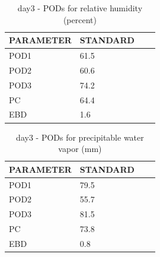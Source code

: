\begin{table}[p!]
\begin{center}
\begin{tabular}{|l|l|l|l|}
\hline
\multicolumn{1}{|c|}{\cellcolor[HTML]{C0C0C0}\textbf{PARAMETER}} & \multicolumn{1}{c|}{\cellcolor[HTML]{C0C0C0}\textbf{STANDARD}} \\
\hline
\cellcolor[HTML]{C0C0C0}POD1  & 61.5                                \\
\cellcolor[HTML]{C0C0C0}POD2  & 60.6                                \\
\cellcolor[HTML]{C0C0C0}POD3  & 74.2                                \\
\cellcolor[HTML]{C0C0C0}PC    & 64.4                                  \\
\cellcolor[HTML]{C0C0C0}EBD   & 1.6                                 \\
\hline
\end{tabular}
\caption{day3 - PODs for relative humidity (percent)}
\label{tab:podrh:day3}
\end{center}
\end{table}
\begin{table}[p!]
\begin{center}
\begin{tabular}{|l|l|l|l|}
\hline
\multicolumn{1}{|c|}{\cellcolor[HTML]{C0C0C0}\textbf{PARAMETER}} & \multicolumn{1}{c|}{\cellcolor[HTML]{C0C0C0}\textbf{STANDARD}} \\
\hline
\cellcolor[HTML]{C0C0C0}POD1  & 79.5                                \\
\cellcolor[HTML]{C0C0C0}POD2  & 55.7                                \\
\cellcolor[HTML]{C0C0C0}POD3  & 81.5                                \\
\cellcolor[HTML]{C0C0C0}PC    & 73.8                                  \\
\cellcolor[HTML]{C0C0C0}EBD   & 0.8                                 \\
\hline
\end{tabular}
\caption{day3 - PODs for precipitable water vapor (mm)}
\label{tab:podpwv:day3}
\end{center}
\end{table}
